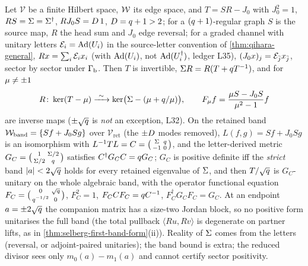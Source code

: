 \begin{theorem}
\label{thm:hashimoto-lift-metric}
Let $\mathcal V$ be a finite Hilbert space, $\mathcal W$ its edge space, and $T = SR-J_0$ with
$J_0^2 = 1$, $RS = \Sigma = \Sigma^\dagger$, $RJ_0S = D\,1$, $D = q+1>2$; for a $(q+1)$-regular
graph $S$ is the source map, $R$ the head sum and $J_0$ edge reversal; for a graded channel with
unitary letters $\mathcal E_{i} = \operatorname{Ad}(U_i)$ in the source-letter convention of \cref{thm:qihara-general},
$Rx = \sum_i\mathcal E_{i}x_i$ (with $\operatorname{Ad}(U_i)$, not $\operatorname{Ad}(U_i^\dagger)$, ledger L35), $(J_0x)_j =
\mathcal E_{\bar{j}}x_{\bar{j}}$, sector by sector under $\Gamma_{\mathrm b}$. Then $T$ is invertible,
$\Sigma R = R(T+q T^{-1})$, and for $\mu\ne\pm1$
\[
  R\colon\ker(T-\edgeev)\xrightarrow{\ \sim\ }\ker\bigl(\Sig-(\edgeev+\qs/\edgeev)\bigr),\qquad
  F_\edgeev f = \frac{\edgeev S-J_0S}{\edgeev^2-1}f
\]
are inverse maps ($\pm\sqrt{q}$ is \emph{not} an exception, L32). On the retained band
$\mathcal W_{\mathrm{band}} = \{Sf+J_0Sg\}$ over $\mathcal V_{\mathrm{ret}}$ (the $\pm D$ modes removed),
$L(f,g) = Sf+J_0Sg$ is an isomorphism with $L^{-1}TL = C = \bigl(\begin{smallmatrix}\Sigma&q\\-1&0\end{smallmatrix}\bigr)$,
and the letter-derived metric $G_C = \bigl(\begin{smallmatrix}1&\Sigma/2\\\Sigma/2&q\end{smallmatrix}\bigr)$
satisfies $C^\dagger G_CC = q G_C$; $G_C$ is positive definite iff the \emph{strict} band
$|a|<2\sqrt{q}$ holds for every retained eigenvalue of $\Sigma$, and then $T/\sqrt{q}$ is
$G_C$-unitary on the whole algebraic band, with the operator functional equation $F_C =
\bigl(\begin{smallmatrix}0&\sqrt{q}\\q^{-1/2}&0\end{smallmatrix}\bigr)$, $F_C^2 = 1$,
$F_CCF_C = q C^{-1}$, $F_C^\dagger G_CF_C = G_C$. At an endpoint $a = \pm2\sqrt{q}$ the companion
matrix has a size-two Jordan block, so no positive form unitarises the full band (the total
pullback $\langle Ru,Rv\rangle$ is degenerate on partner lifts, as in
\cref{thm:selberg-first-band-form}(ii)). Reality of $\Sigma$ comes from the letters (reversal, or
adjoint-paired unitaries); the band bound is extra; the reduced divisor sees only
$m_0(a)-m_1(a)$ and cannot certify sector positivity.
\end{theorem}
